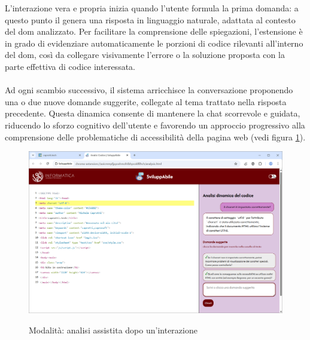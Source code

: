 \noindent L’interazione vera e propria inizia quando l’utente formula la prima domanda: a questo punto il  genera una risposta in linguaggio naturale, adattata al contesto del \acrshort{dom} analizzato. Per facilitare la comprensione delle spiegazioni, l’estensione è in grado di evidenziare automaticamente le porzioni di codice rilevanti all’interno del \acrshort{dom}, così da collegare visivamente l’errore o la soluzione proposta con la parte effettiva di codice interessata.\\
\\
Ad ogni scambio successivo, il sistema arricchisce la conversazione proponendo una o due nuove domande suggerite, collegate al tema trattato nella risposta precedente. Questa dinamica consente di mantenere la chat scorrevole e guidata, riducendo lo sforzo cognitivo dell’utente e favorendo un approccio progressivo alla comprensione delle problematiche di accessibilità della pagina web (vedi figura \ref{fig:aass2}).

\begin{figure}[H]
    \centering
    \includegraphics[width=1\linewidth, alt={Modalità di analisi assistita, dopo la prima interazione}]{img/analisi_ass2.png}
    \caption{Modalità: analisi assistita dopo un'interazione}\label{fig:aass2}
\end{figure}

